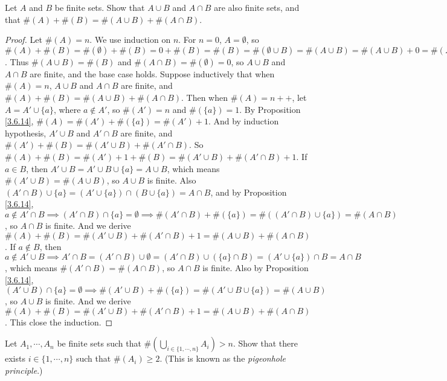 \begin{exercise}\label{ex 3.6.9}
Let \(A\) and \(B\) be finite sets.
Show that \(A \cup B\) and \(A \cap B\) are also finite sets, and that \(\#(A) + \#(B) = \#(A \cup B) + \#(A \cap B)\).
\end{exercise}

\begin{proof}
Let \(\#(A) = n\).
We use induction on \(n\).
For \(n = 0\), \(A = \emptyset\), so \(\#(A) + \#(B) = \#(\emptyset) + \#(B) = 0 + \#(B) = \#(B) = \#(\emptyset \cup B) = \#(A \cup B) = \#(A \cup B) + 0 = \#(A \cup B) + \#(\emptyset) = \#(A \cup B) + \#(\emptyset \cap B) = \#(A \cup B) + \#(A \cap B)\).
Thus \(\#(A \cup B) = \#(B)\) and \(\#(A \cap B) = \#(\emptyset) = 0\), so \(A \cup B\) and \(A \cap B\) are finite, and the base case holds.
Suppose inductively that when \(\#(A) = n\), \(A \cup B\) and \(A \cap B\) are finite, and \(\#(A) + \#(B) = \#(A \cup B) + \#(A \cap B)\).
Then when \(\#(A) = n++\), let \(A = A' \cup \{a\}\), where \(a \notin A'\), so \(\#(A') = n\) and \(\#(\{a\}) = 1\).
By Proposition \ref{3.6.14}, \(\#(A) = \#(A') + \#(\{a\}) = \#(A') + 1\).
And by induction hypothesis, \(A' \cup B\) and \(A' \cap B\) are finite, and \(\#(A') + \#(B) = \#(A' \cup B) + \#(A' \cap B)\).
So \(\#(A) + \#(B) = \#(A') + 1 + \#(B) = \#(A' \cup B) + \#(A' \cap B) + 1\).
If \(a \in B\), then \(A' \cup B = A' \cup B \cup \{a\} = A \cup B\), which means \(\#(A' \cup B) = \#(A \cup B)\), so \(A \cup B\) is finite.
Also \((A' \cap B) \cup \{a\} = (A' \cup \{a\}) \cap (B \cup \{a\}) = A \cap B\), and by Proposition \ref{3.6.14}, \(a \notin A' \cap B \implies (A' \cap B) \cap \{a\} = \emptyset \implies \#(A' \cap B) + \#(\{a\}) = \#((A' \cap B) \cup \{a\}) = \#(A \cap B)\), so \(A \cap B\) is finite.
And we derive \(\#(A) + \#(B) = \#(A' \cup B) + \#(A' \cap B) + 1 = \#(A \cup B) + \#(A \cap B)\).
If \(a \notin B\), then \(a \notin A' \cup B \implies A' \cap B = (A' \cap B) \cup \emptyset = (A' \cap B) \cup (\{a\} \cap B) = (A' \cup \{a\}) \cap B = A \cap B\), which means \(\#(A' \cap B) = \#(A \cap B)\), so \(A \cap B\) is finite.
Also by Proposition \ref{3.6.14}, \((A' \cup B) \cap \{a\} = \emptyset \implies \#(A' \cup B) + \#(\{a\}) = \#(A' \cup B \cup \{a\}) = \#(A \cup B)\), so \(A \cup B\) is finite.
And we derive \(\#(A) + \#(B) = \#(A' \cup B) + \#(A' \cap B) + 1 = \#(A \cup B) + \#(A \cap B)\).
This close the induction.
\end{proof}

\begin{exercise}\label{ex 3.6.10}
Let \(A_1, \cdots, A_n\) be finite sets such that \(\#(\bigcup_{i \in \{1, \cdots, n\}} A_i) > n\).
Show that there exists \(i \in \{1, \cdots, n\}\) such that \(\#(A_i) \geq 2\).
(This is known as the \emph{pigeonhole principle}.)
\end{exercise}

